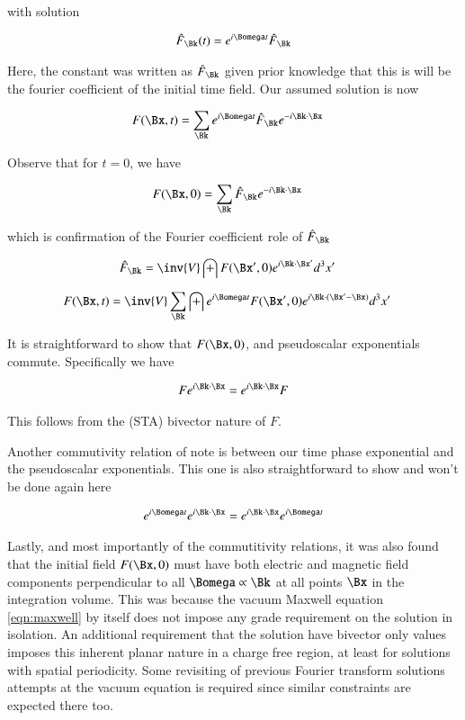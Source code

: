\documentclass{article}
\begin{document}
with solution

\begin{align}
\hat{F}_{\Bk}(t) = e^{i \Bomega t} \hat{F}_{\Bk}
\end{align}

Here, the constant was written as $\hat{F}_{\Bk}$ given prior knowledge that this is will be the fourier coefficient of the
initial time field.  Our assumed solution is now

\begin{align}\label{eqn:assummedSolutionNewStartingPoint}
F(\Bx,t) &= \sum_{\Bk} e^{i \Bomega t} \hat{F}_{\Bk} e^{-i \Bk \cdot \Bx}
\end{align}

Observe that for $t = 0$, we have

\begin{align*}
F(\Bx,0) &= \sum_{\Bk} \hat{F}_{\Bk} e^{-i \Bk \cdot \Bx}
\end{align*}

which is confirmation of the Fourier coefficient role of $\hat{F}_{\Bk}$

\begin{align}
\hat{F}_{\Bk} &= \inv{V} \int F(\Bx', 0) e^{ i \Bk \cdot \Bx' } d^3 x'
\end{align}

\begin{align}\label{eqn:solutionFromInitialConditions}
F(\Bx,t) &= \inv{V} \sum_{\Bk} \int e^{i \Bomega t} F(\Bx', 0) e^{i \Bk \cdot (\Bx'-\Bx) } d^3 x'
\end{align}

It is straightforward to show that $F(\Bx, 0)$, and pseudoscalar exponentials commute.  Specifically we have

\begin{align}
F e^{ i \Bk \cdot \Bx } = e^{ i \Bk \cdot \Bx } F
\end{align}

This follows from the (STA) bivector nature of $F$.

Another commutivity relation of note is between our time phase exponential and the pseudoscalar exponentials.  This one is also straightforward to show
and won't be done again here

\begin{align}
e^{ i \Bomega t} e^{ i \Bk \cdot \Bx } = e^{ i \Bk \cdot \Bx } e^{ i \Bomega t}
\end{align}

Lastly, and most importantly of the commutitivity relations,
it was also found that the initial field $F(\Bx,0)$ must have both electric and magnetic field components perpendicular to all $\Bomega \propto \Bk$ at all points
$\Bx$ in the integration volume.
This was because the vacuum Maxwell equation \ref{eqn:maxwell} by itself does not impose any grade requirement on the solution in isolation.  An
additional requirement that the solution have bivector only values imposes this inherent planar nature in a charge free region, at least for solutions
with spatial periodicity.  Some revisiting of previous Fourier transform solutions attempts at the vacuum equation is required since similar constraints are
expected there too.
\end{document}
